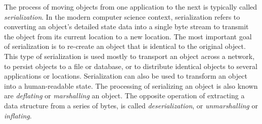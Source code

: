 \documentclass[11pt,relax]{SANDreport}
\begin{document}
The process of moving objects from one application to the next is
typically called {\sl serialization}.
In the modern computer science context, serialization refers to
converting an object's detailed state data into a single byte stream to
transmit the object from its current location to a new location.  The most
important goal of serialization is to re-create an object that is identical to
the original object. This type of serialization is used mostly to transport an
object across a network, to persist objects to a file or database, or to
distribute identical objects to several applications or locations.
Serialization can also be used to transform an object into a human-readable
state. 
The processing of serializing an object is also known are {\sl deflating} or
{\sl marshalling} an object. The opposite operation of extracting a data
structure from a series of bytes, is called {\sl deserialization}, or {\sl
  unmarshalling} or {\sl inflating}. 

\smallskip
\end{document}
